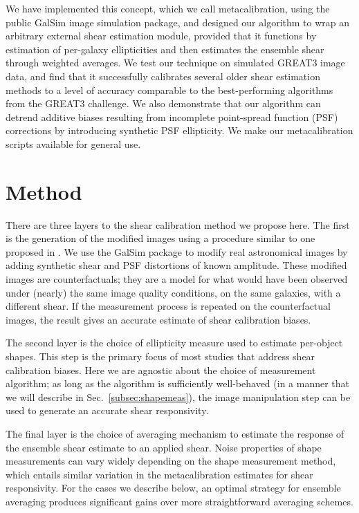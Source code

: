 \documentclass[iop]{emulateapj}
\begin{document}
We have implemented this concept, which we call metacalibration, using
the public GalSim \citep{2015A&C....10..121R} image simulation
package, and designed our algorithm to wrap an arbitrary external
shear estimation module, provided that it functions by estimation of per-galaxy ellipticities and
then estimates the ensemble shear through weighted averages. We test our technique on simulated GREAT3
image data, and find that it successfully calibrates several older shear
estimation methods to a level of accuracy comparable to the
best-performing algorithms from the GREAT3 challenge. We also
demonstrate that our algorithm can detrend additive biases resulting
from incomplete point-spread function (PSF) corrections by introducing synthetic PSF
ellipticity.  We make our metacalibration scripts available for
general use.

\section{Method}
There are three layers to the shear calibration method we propose
here. The first is the generation of the modified images using a procedure similar to one proposed
in \cite{2000ApJ...537..555K}.
We use the GalSim package \citep{2015A&C....10..121R} to modify real
astronomical images by adding synthetic shear and PSF distortions of
known amplitude. These modified images are counterfactuals; they are a
model for what would have been observed under (nearly) the same image
quality conditions, on the same galaxies, with a different shear. If
the measurement process is repeated on the counterfactual images, the
result gives an accurate estimate of shear calibration biases.

The second layer is the choice of ellipticity measure used to estimate
per-object shapes. This step is the primary focus of most studies that
address shear calibration biases. Here we are agnostic about the
choice of measurement algorithm; as long as the algorithm is
sufficiently well-behaved (in a manner that we will describe in
Sec.~\ref{subsec:shapemeas}), the image manipulation step can be used
to generate an accurate shear responsivity.

The final layer is the choice of averaging mechanism to estimate the
response of the ensemble shear estimate to an applied shear. Noise
properties of shape measurements can vary widely depending on the
shape measurement method, which entails similar variation in the
metacalibration estimates for shear responsivity. For the cases we
describe below, an optimal strategy for ensemble averaging produces
significant gains over more straightforward averaging schemes.
\end{document}
